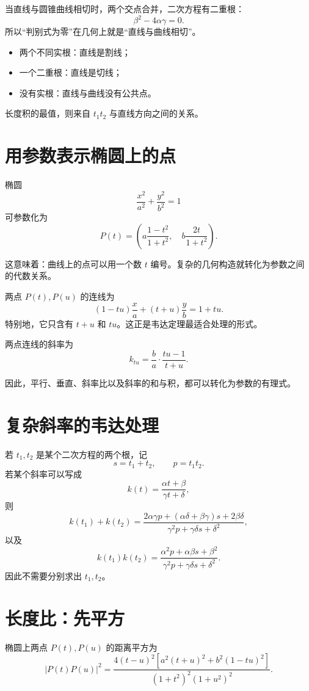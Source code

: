 \documentclass[11pt,a4paper]{ctexart}
\begin{document}
当直线与圆锥曲线相切时，两个交点合并，二次方程有二重根：
\[
\boxed{\beta^2-4\alpha\gamma=0}.
\]
所以“判别式为零”在几何上就是“直线与曲线相切”。

\begin{itemize}
  \item 两个不同实根：直线是割线；
  \item 一个二重根：直线是切线；
  \item 没有实根：直线与曲线没有公共点。
\end{itemize}

长度积的最值，则来自 $t_1t_2$ 与直线方向之间的关系。

\section{用参数表示椭圆上的点}

椭圆
\[
\frac{x^2}{a^2}+\frac{y^2}{b^2}=1
\]
可参数化为
\[
P(t)=\left(
a\frac{1-t^2}{1+t^2},\quad
b\frac{2t}{1+t^2}
\right).
\]

这意味着：曲线上的点可以用一个数 $t$ 编号。复杂的几何构造就转化为参数之间的代数关系。

两点 $P(t),P(u)$ 的连线为
\[
\boxed{(1-tu)\frac{x}{a}+(t+u)\frac{y}{b}=1+tu}.
\]
特别地，它只含有 $t+u$ 和 $tu$。这正是韦达定理最适合处理的形式。

两点连线的斜率为
\[
\boxed{k_{tu}=\frac ba\cdot\frac{tu-1}{t+u}}.
\]

因此，平行、垂直、斜率比以及斜率的和与积，都可以转化为参数的有理式。

\section{复杂斜率的韦达处理}

若 $t_1,t_2$ 是某个二次方程的两个根，记
\[
s=t_1+t_2,\qquad p=t_1t_2.
\]
若某个斜率可以写成
\[
k(t)=\frac{\alpha t+\beta}{\gamma t+\delta},
\]
则
\[
k(t_1)+k(t_2)
=
\frac{2\alpha\gamma p+(\alpha\delta+\beta\gamma)s+2\beta\delta}
{\gamma^2p+\gamma\delta s+\delta^2},
\]
以及
\[
k(t_1)k(t_2)
=
\frac{\alpha^2p+\alpha\beta s+\beta^2}
{\gamma^2p+\gamma\delta s+\delta^2}.
\]
因此不需要分别求出 $t_1,t_2$。

\section{长度比：先平方}

椭圆上两点 $P(t),P(u)$ 的距离平方为
\[
|P(t)P(u)|^2
=
\frac{4(t-u)^2\left[a^2(t+u)^2+b^2(1-tu)^2\right]}
{(1+t^2)^2(1+u^2)^2}.
\]
\end{document}

